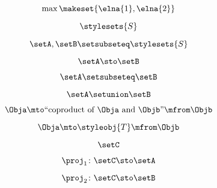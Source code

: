{\begin{forslides}
        \begin{equation}
            \label{eq:parallelism-143}
            \max\makeset{\elna{1},\elna{2}}
        \end{equation}

        \begin{equation}
            \label{eq:parallelism-144}
            \stylesets{S}
        \end{equation}

        \begin{equation}
            \label{eq:parallelism-145}
            \setA,\setB\setsubseteq \stylesets{S}
        \end{equation}

        \begin{equation}
            \label{eq:parallelism-146}
            \setA \sto \setB
        \end{equation}

        \begin{equation}
            \label{eq:parallelism-147}
            \setA\setsubseteq \setB
        \end{equation}

        \begin{equation}
            \label{eq:parallelism-148}
            \setA\setunion\setB
        \end{equation}

        \begin{equation}
            \label{eq:parallelism-149}
            \Obja \mto \text{``coproduct of } \Obja \text{ and } \Objb \text{''}  \mfrom \Objb
        \end{equation}

        \begin{equation}
            \label{eq:parallelism-150}
            \Obja \mto \styleobj{T} \mfrom \Objb
        \end{equation}

        \begin{equation}
            \label{eq:parallelism-151}
            \setC
        \end{equation}

        \begin{equation}
            \label{eq:parallelism-152}
            \proj_1\colon \setC \sto \setA
        \end{equation}

        \begin{equation}
            \label{eq:parallelism-153}
            \proj_2\colon \setC \sto \setB
        \end{equation}


\end{forslides}}
